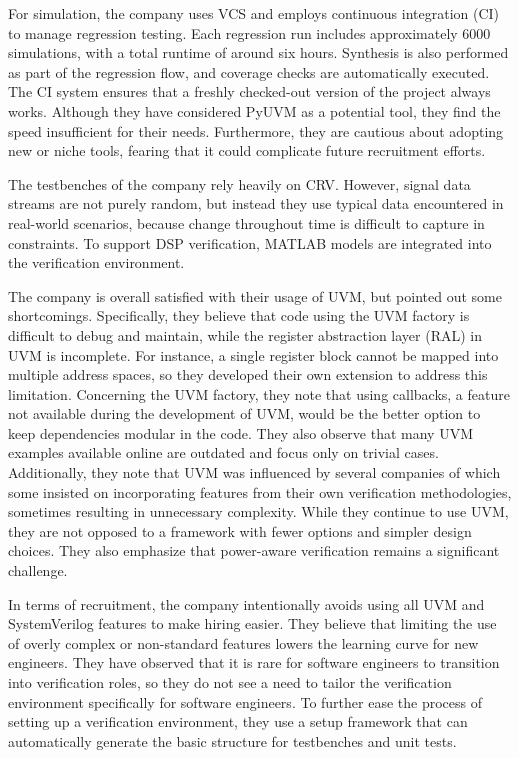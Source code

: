 \documentclass[11pt]{report}
\begin{document}
For simulation, the company uses VCS and employs continuous integration (CI) to manage regression testing. Each
regression run includes approximately 6000 simulations, with a total runtime of around six hours. Synthesis is also
performed as part of the regression flow, and coverage checks are automatically executed. The CI system ensures that
a freshly checked-out version of the project always works. Although they have considered PyUVM as a potential tool,
they find the speed insufficient for their needs. Furthermore, they are cautious about adopting new or niche tools,
fearing that it could complicate future recruitment efforts.

The testbenches of the company rely heavily on CRV. However, signal data streams are not purely random, but instead
they use typical data encountered in real-world scenarios, because change throughout time is difficult to capture in
constraints. To support DSP verification, MATLAB models are integrated into the verification environment.

The company is overall satisfied with their usage of UVM, but pointed out some shortcomings. Specifically, they
believe that code using the UVM factory is difficult to debug and maintain, while the register abstraction layer
(RAL) in UVM is incomplete. For instance, a single register block cannot be mapped into multiple address spaces, so
they developed their own extension to address this limitation. Concerning the UVM factory, they note that using
callbacks, a feature not available during the development of UVM, would be the better option to keep dependencies
modular in the code. They also observe that many UVM examples available online are outdated and focus only on trivial
cases. Additionally, they note that UVM was influenced by several companies of which some insisted on incorporating
features from their own verification methodologies, sometimes resulting in unnecessary complexity. While they
continue to use UVM, they are not opposed to a framework with fewer options and simpler design choices. They
also emphasize that power-aware verification remains a significant challenge.

In terms of recruitment, the company intentionally avoids using all UVM and SystemVerilog features to make hiring
easier. They believe that limiting the use of overly complex or non-standard features lowers the learning curve for
new engineers. They have observed that it is rare for software engineers to transition into verification roles, so
they do not see a need to tailor the verification environment specifically for software engineers. To further ease
the process of setting up a verification environment, they use a setup framework that can automatically generate the
basic structure for testbenches and unit tests.
\end{document}
